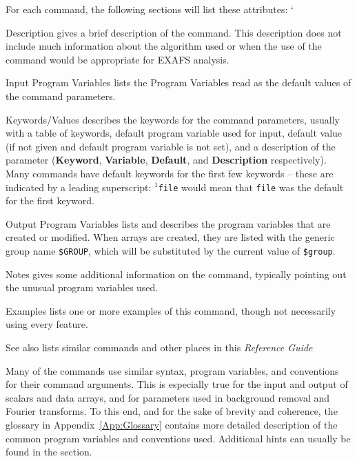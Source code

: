 For each command, the following sections will list these attributes:
`\begin{IFFcom}
\item[Description] gives a brief description of the command.
  This description does not include much information about the algorithm
  used or when the use of the command would be appropriate for EXAFS
  analysis.
\item [Input Program Variables] lists the Program Variables
  read as the default values of the command parameters.
\item [Keywords/Values] describes the keywords for the command
  parameters, usually with a table of keywords, default program variable used
  for input, default value (if not given and default program variable is not
  set), and a description of the parameter (\textbf{Keyword},
  \textbf{Variable}, \textbf{Default}, and \textbf{Description} respectively).
  Many commands have default keywords for the first few keywords -- these are
  indicated by a leading superscript: {\tt{${}^{1}$file}} would mean that
  {\tt{file}} was the default for the first keyword.
\item [Output Program Variables] lists and describes the program
 variables that are created or modified.    When arrays are created, they
 are listed with the generic group name {\tt{\$GROUP}}, which will be
 substituted by the current value of {\tt{\$group}}.
\item [Notes] gives some additional information on the command, typically
  pointing out the unusual program variables used. 
\item [Examples] lists one or more examples of this command, though not
  necessarily using every feature.
\item [See also] lists similar commands and other places in this
  {\textsl{Reference Guide}} 

\end{IFFcom}
\noindent

Many of the {\ifeffit} commands use similar syntax, program variables, and
conventions for their command arguments.  This is especially true for the
input and output of scalars and data arrays, and for parameters used in
background removal and Fourier transforms.  To this end, and for the sake of
brevity and coherence, the glossary in Appendix~{\ref{App:Glossary}} contains
more detailed description of the common program variables and conventions
used.  Additional hints can usually be found in the  section.


